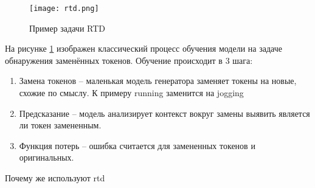 \documentclass[../part_1.tex]{subfiles}
\begin{document}
\begin{figure}[h]
    \centering
    \texttt{[image: rtd.png]}
    \caption{Пример задачи RTD}
    \label{fig:rtd_bert}
\end{figure}

\par На рисунке \ref{fig:rtd_bert} изображен классический процесс обучения модели на задаче обнаружения заменённых токенов. Обучение происходит в 3 шага:
\begin{enumerate}
    \item Замена токенов -- маленькая модель генератора заменяет токены на новые, схожие по смыслу. К примеру running заменится на jogging 
    \item Предсказание -- модель анализирует контекст вокруг замены выявить является ли токен замененным.
    \item Функция потерь -- ошибка считается для замененных токенов и оригинальных.
\end{enumerate}
\par Почему же используют \acrshort{rtd}
\begin{itemize}
\end{itemize}
\end{document}
